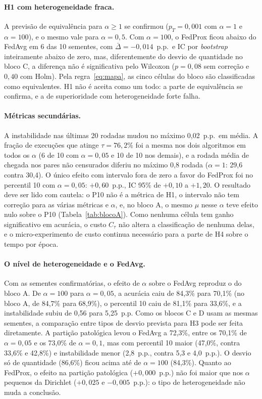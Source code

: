 \paragraph{H1 com heterogeneidade fraca.} A previsão de equivalência para $\alpha \geq 1$ se confirmou ($p_T = 0{,}001$ com $\alpha = 1$ e $\alpha = 100$), e o mesmo vale para $\alpha = 0{,}5$. Com $\alpha = 100$, o FedProx ficou abaixo do FedAvg em 6 das 10 sementes, com $\bar\Delta = -0{,}014$~p.p.\ e IC por \textit{bootstrap} inteiramente abaixo de zero, mas, diferentemente do desvio de quantidade no bloco C, a diferença não é significativa pelo Wilcoxon ($p = 0{,}08$ sem correção e $0{,}40$ com Holm). Pela regra~\eqref{eq:mapa}, as cinco células do bloco são classificadas como equivalentes. H1 não é aceita como um todo: a parte de equivalência se confirma, e a de superioridade com heterogeneidade forte falha.

\paragraph{Métricas secundárias.} A instabilidade nas últimas 20 rodadas mudou no máximo 0,02~p.p.\ em média. A fração de execuções que atinge $\tau = 76{,}2\%$ foi a mesma nos dois algoritmos em todos os $\alpha$ (6 de 10 com $\alpha = 0{,}05$ e 10 de 10 nos demais), e a rodada média de chegada nos pares não censurados diferiu no máximo 0,8 rodada ($\alpha = 1$: 29,6 contra 30,4). O único efeito com intervalo fora de zero a favor do FedProx foi no percentil 10 com $\alpha = 0{,}05$: $+0{,}60$~p.p., IC 95\% de $+0{,}10$ a $+1{,}20$. O resultado deve ser lido com cautela: o P10 não é a métrica de H1, o intervalo não tem correção para as várias métricas e $\alpha$, e, no bloco A, o mesmo $\mu$ nesse $\alpha$ teve efeito nulo sobre o P10 (Tabela~\ref{tab:blocoA}). Como nenhuma célula tem ganho significativo em acurácia, o custo $C_\tau$ não altera a classificação de nenhuma delas, e o micro-experimento de custo continua necessário para a parte de H4 sobre o tempo por época.

\paragraph{O nível de heterogeneidade e o FedAvg.} Com as sementes confirmatórias, o efeito de $\alpha$ sobre o FedAvg reproduz o do bloco A. De $\alpha = 100$ para $\alpha = 0{,}05$, a acurácia caiu de 84,3\% para 70,1\% (no bloco A, de 84,7\% para 68,9\%), o percentil 10 caiu de 81,1\% para 33,6\%, e a instabilidade subiu de 0,56 para 5,25~p.p. Como os blocos C e D usam as mesmas sementes, a comparação entre tipos de desvio prevista para H3 pode ser feita diretamente. A partição patológica levou o FedAvg a 72,3\%, entre os 70,1\% de $\alpha = 0{,}05$ e os 73,0\% de $\alpha = 0{,}1$, mas com percentil 10 maior (47,0\%, contra 33,6\% e 42,8\%) e instabilidade menor (2,8~p.p., contra 5,3 e 4,0~p.p.). O desvio só de quantidade (86,6\%) ficou acima até de $\alpha = 100$ (84,3\%). Quanto ao FedProx, o efeito na partição patológica ($+0{,}000$~p.p.) não foi maior que nos $\alpha$ pequenos da Dirichlet ($+0{,}025$ e $-0{,}005$~p.p.): o tipo de heterogeneidade não muda a conclusão.

